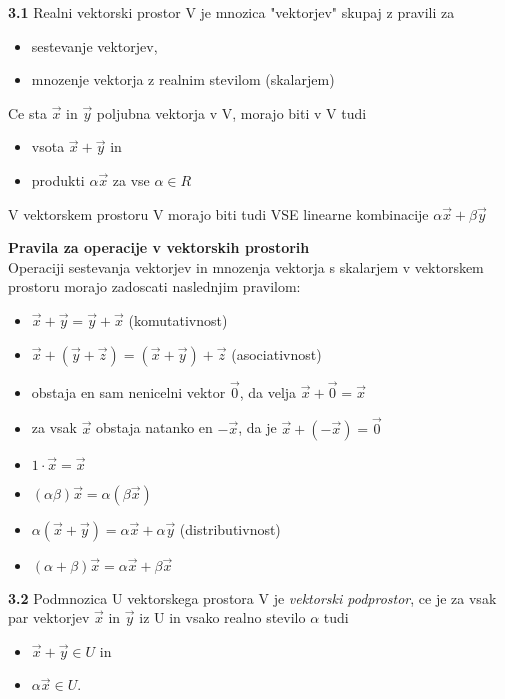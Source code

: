 \documentclass{article}
\begin{document}
\begin{multicols}{4}
\textbf{3.1} Realni vektorski prostor V je mnozica "vektorjev" skupaj z pravili za
\begin{itemize}
    \item sestevanje vektorjev,
    \item mnozenje vektorja z realnim stevilom (skalarjem)
\end{itemize}
Ce sta $\vec{x}$ in $\vec{y}$ poljubna vektorja v V, morajo biti v V tudi
\begin{itemize}
    \item vsota $\vec{x} + \vec{y}$ in 
    \item produkti $\alpha\vec{x}$ za vse $\alpha \in R$
\end{itemize}
V vektorskem prostoru V morajo biti tudi VSE linearne kombinacije
$\alpha\vec{x} + \beta\vec{y}$

\textbf{Pravila za operacije v vektorskih prostorih}\\
Operaciji sestevanja vektorjev in mnozenja vektorja s skalarjem v vektorskem prostoru
morajo zadoscati naslednjim pravilom:
\begin{itemize}
    \item $\vec{x} + \vec{y} = \vec{y} + \vec{x}$ (komutativnost)
    \item $\vec{x} + (\vec{y} + \vec{z}) = (\vec{x} + \vec{y}) + \vec{z}$ (asociativnost)
    \item obstaja en sam nenicelni vektor $\vec{0}$, da velja $\vec{x} + \vec{0} = \vec{x}$
    \item za vsak $\vec{x}$ obstaja natanko en $-\vec{x}$, da je $\vec{x} + (-\vec{x}) = \vec{0}$
    \item $1 \cdot \vec{x} = \vec{x}$
    \item $(\alpha\beta)\vec{x} = \alpha(\beta\vec{x})$
    \item $\alpha(\vec{x} + \vec{y}) = \alpha\vec{x} + \alpha\vec{y}$ (distributivnost)
    \item $(\alpha + \beta)\vec{x} = \alpha\vec{x} + \beta\vec{x}$
\end{itemize}

\textbf{3.2} Podmnozica U vektorskega prostora V je \textit{vektorski podprostor}, ce je za
vsak par vektorjev $\vec{x}$ in $\vec{y}$ iz U in vsako realno stevilo $\alpha$ tudi
\begin{itemize}
    \item $\vec{x} + \vec{y} \in U$ in
    \item $\alpha\vec{x} \in U$.
\end{itemize}


\end{multicols}
\end{document}
